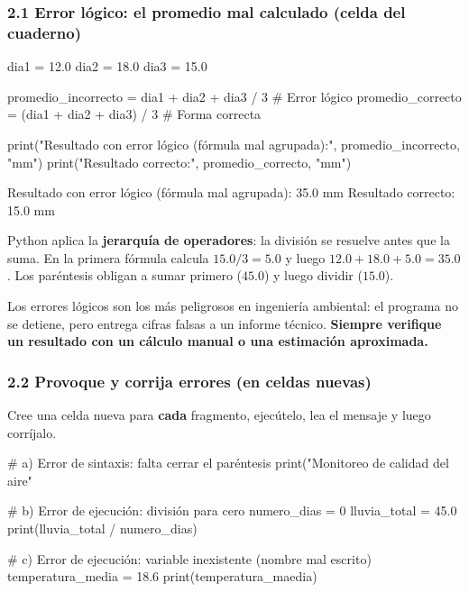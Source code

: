 \documentclass[11pt,a4paper]{article}
\begin{document}
\subsubsection{2.1 Error lógico: el promedio mal calculado (celda del cuaderno)}
\begin{codigo}
dia1 = 12.0
dia2 = 18.0
dia3 = 15.0

promedio_incorrecto = dia1 + dia2 + dia3 / 3     # Error lógico
promedio_correcto = (dia1 + dia2 + dia3) / 3     # Forma correcta

print("Resultado con error lógico (fórmula mal agrupada):", promedio_incorrecto, "mm")
print("Resultado correcto:", promedio_correcto, "mm")
\end{codigo}
\begin{salida}
Resultado con error lógico (fórmula mal agrupada): 35.0 mm
Resultado correcto: 15.0 mm
\end{salida}

Python aplica la \textbf{jerarquía de operadores}: la división se resuelve antes que la suma. En la primera fórmula calcula $15.0/3 = 5.0$ y luego $12.0 + 18.0 + 5.0 = 35.0$. Los paréntesis obligan a sumar primero ($45.0$) y luego dividir ($15.0$).

\begin{crit}
Los errores lógicos son los más peligrosos en ingeniería ambiental: el programa no se detiene, pero entrega cifras falsas a un informe técnico. \textbf{Siempre verifique un resultado con un cálculo manual o una estimación aproximada.}
\end{crit}

\subsubsection{2.2 Provoque y corrija errores (en celdas nuevas)}
Cree una celda nueva para \textbf{cada} fragmento, ejecútelo, lea el mensaje y luego corríjalo.

\begin{codigo}
# a) Error de sintaxis: falta cerrar el paréntesis
print("Monitoreo de calidad del aire"
\end{codigo}

\begin{codigo}
# b) Error de ejecución: división para cero
numero_dias = 0
lluvia_total = 45.0
print(lluvia_total / numero_dias)
\end{codigo}

\begin{codigo}
# c) Error de ejecución: variable inexistente (nombre mal escrito)
temperatura_media = 18.6
print(temperatura_maedia)
\end{codigo}
\end{document}
